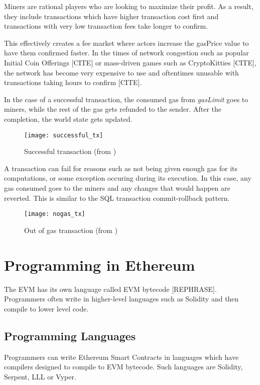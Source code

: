 Miners are rational players who are looking to maximize their profit. As a result, they include transactions which have higher transaction cost first and transactions with very low transaction fees take longer to confirm.

This effectively creates a fee market  where actors increase the gasPrice value to have them confirmed faster. In the times of network congestion such as popular Initial Coin Offerings [CITE] or mass-driven games such as CryptoKitties [CITE], the network has become very expensive to use and oftentimes unusable with transactions taking hours to confirm [CITE]. 

In the case of a successful transaction, the consumed gas from \textit{gasLimit} goes to miners, while the rest of the gas gets refunded to the sender. After the completion, the world state gets updated.

\begin{figure}[H]
    \centering
    \texttt{[image: successful\_tx]}
    \caption{Successful transaction (from \cite{preethi})}
    \label{successful_tx}
\end{figure}

A transaction can fail for reasons such as not being given enough gas for its computations, or some exception occuring during its execution. In this case, any gas consumed goes to the miners and any changes that would happen are reverted. This is similar to the SQL transaction commit-rollback pattern.

\begin{figure}[H]
    \centering
    \texttt{[image: nogas\_tx]}
    \caption{Out of gas transaction (from \cite{preethi})}
    \label{nogas_tx}
\end{figure}


\section{Programming in Ethereum}
The EVM has its own language called EVM bytecode [REPHRASE]. Programmers often write in higher-level languages such as Solidity and then compile to lower level code. 

\subsection{Programming Languages}
Programmers can write Ethereum Smart Contracts in languages which have compilers designed to compile to EVM bytecode. Such languages are Solidity, Serpent, LLL or Vyper. 

